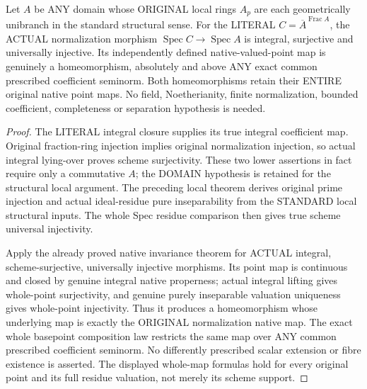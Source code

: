\begin{theorem}
\label{scheme:structural-domain-normalization-native-homeomorphism}
Let $A$ be ANY domain whose ORIGINAL local rings $A_p$ are each
geometrically unibranch in the standard structural sense.
For the LITERAL $C=\overline A^{\operatorname{Frac}A}$, the ACTUAL
normalization morphism $\operatorname{Spec}C\to\operatorname{Spec}A$
is integral, surjective and universally injective. Its independently
defined native-valued-point map is genuinely a homeomorphism,
absolutely and above ANY exact common prescribed coefficient seminorm.
Both homeomorphisms retain their ENTIRE original native point maps.
No field, Noetherianity, finite normalization, bounded coefficient,
completeness or separation hypothesis is needed.
\leanok
\end{theorem}
\begin{proof}
The LITERAL integral closure supplies its true integral coefficient
map. Original fraction-ring injection implies original normalization
injection, so actual integral lying-over proves scheme surjectivity.
These two lower assertions in fact require only a commutative $A$;
the DOMAIN hypothesis is retained for the structural local argument.
The preceding local theorem derives original prime injection and
actual ideal-residue pure inseparability from the STANDARD local
structural inputs. The whole Spec residue comparison then gives
true scheme universal injectivity.

Apply the already proved native invariance theorem for ACTUAL integral,
scheme-surjective, universally injective morphisms. Its point map is
continuous and closed by genuine integral native properness; actual
integral lifting gives whole-point surjectivity, and genuine purely
inseparable valuation uniqueness gives whole-point injectivity.
Thus it produces a homeomorphism whose underlying map is exactly the
ORIGINAL normalization native map. The exact whole basepoint composition
law restricts the same map over ANY common prescribed coefficient
seminorm. No differently prescribed scalar extension or fibre existence
is asserted. The displayed whole-map formulas hold for every original
point and its full residue valuation, not merely its scheme support.
\end{proof}


